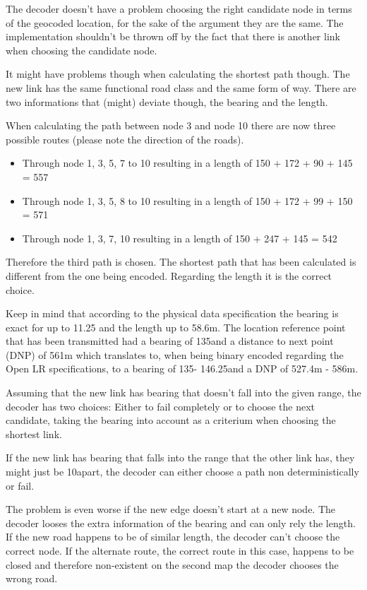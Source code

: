 The decoder doesn't have a problem choosing the right candidate node in terms of the geocoded location, for the sake of the argument they are the same. The implementation shouldn't be thrown off by the fact that there is another link when choosing the candidate node.

It might have problems though when calculating the shortest path though. The new link has the same functional road class and the same form of way. There are two informations that (might) deviate though, the bearing and the length.

When calculating the path between node 3 and node 10 there are now three possible routes (please note the direction of the roads). 

\begin{itemize}
	\item Through node 1, 3, 5, 7 to 10 resulting in a length of 150 + 172 + 90 + 145 = 557  
	\item Through node 1, 3, 5, 8 to 10 resulting in a length of 150 + 172 + 99 + 150 = 571
	\item Through node 1, 3, 7, 10 resulting in a length of 150 + 247 + 145 = 542  
\end{itemize}	

Therefore the third path is chosen. The shortest path that has been calculated is different from the one being encoded. Regarding the length it is the correct choice.

Keep in mind that according to the physical data specification the bearing is exact for up to 11.25 \degree and the length up to 58.6m. The location reference point that 
has been transmitted had a bearing of 135\degree and a distance to next point (DNP) of 561m which translates to, when being binary encoded regarding the Open LR specifications, to a bearing of 135\degree - 146.25\degree and a DNP of 527.4m - 586m.

Assuming that the new link has bearing that doesn't fall into the given range, the decoder has two choices: Either to fail completely or to choose the next candidate, taking the bearing into account as a criterium when choosing the shortest link.

If the new link has bearing that falls into the range that the other link has, they might just be 10\degree apart, the decoder can either choose a path non deterministically or fail.

The problem is even worse if the new edge doesn't start at a new node. The decoder looses the extra information of the bearing and can only rely the length. If the new road happens to be of similar length, the decoder can't choose the correct node. If the alternate route, the correct route in this case, happens to be closed and therefore non-existent on the second map the decoder chooses the wrong road.


